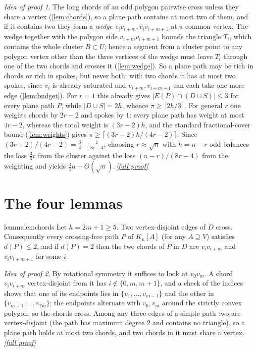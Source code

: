 \documentclass[11pt,a4paper]{article}
\theoremstyle{plain}
\theoremstyle{definition}
\theoremstyle{remark}
\newtheorem*{proofidea}{Idea of proof}
\newcommand{\fullproofref}[1]{\,\hyperref[#1]{\textit{[full proof]}}}
\newcommand{\pipath}{\pi}
\newcommand{\dP}{d}
\begin{document}
\begin{proofidea}
The long chords of an odd polygon pairwise cross unless they share a vertex (\cref{lem:chords}), so a plane path contains at most two of them, and if it contains two they form a \emph{wedge} $v_iv_{i+m},v_iv_{i+m+1}$ at a common vertex. The wedge together with the polygon side $v_{i+m}v_{i+m+1}$ bounds the triangle $T_i$, which contains the whole cluster $B\subset U$; hence a segment from a cluster point to any polygon vertex other than the three vertices of the wedge must leave $T_i$ through one of the two chords and crosses it (\cref{lem:wedge}). So a plane path may be rich in chords or rich in spokes, but never both: with two chords it has at most two spokes, since $v_i$ is already saturated and $v_{i+m},v_{i+m+1}$ can each take one more edge (\cref{lem:budget}). For $r=1$ this already gives $|E(P)\cap(D\cup S)|\le3$ for every plane path $P$, while $|D\cup S|=2h$, whence $\pipath\ge\lceil2h/3\rceil$. For general $r$ one weights chords by $2r-2$ and spokes by $1$: every plane path has weight at most $4r-2$, whereas the total weight is $(3r-2)h$, and the standard fractional-cover bound (\cref{lem:weights}) gives $\pipath\ge\lceil(3r-2)h/(4r-2)\rceil$. Since $(3r-2)/(4r-2)=\tfrac34-\tfrac1{8r-4}$, choosing $r\approx\sqrt n$ with $h=n-r$ odd balances the loss $\tfrac34r$ from the cluster against the loss $(n-r)/(8r-4)$ from the weighting and yields $\tfrac34n-O(\sqrt n)$.\fullproofref{pf:main}
\end{proofidea}

\section{The four lemmas}\label{sec:lemmas}

\begin{restatable}{lemma}{lemchords}\label{lem:chords}
Let $h=2m+1\ge5$. Two vertex-disjoint edges of $D$ cross. Consequently every crossing-free path $P$ of $K_n[A]$ (for any $A\supseteq V$) satisfies $\dP(P)\le2$, and if $\dP(P)=2$ then the two chords of $P$ in $D$ are $v_iv_{i+m}$ and $v_iv_{i+m+1}$ for some $i$.
\end{restatable}
\begin{proofidea}
By rotational symmetry it suffices to look at $v_0v_m$. A chord $v_iv_{i+m}$ vertex-disjoint from it has $i\notin\{0,m,m+1\}$, and a check of the indices shows that one of its endpoints lies in $\{v_1,\dots,v_{m-1}\}$ and the other in $\{v_{m+1},\dots,v_{2m}\}$; the endpoints alternate with $v_0,v_m$ around the strictly convex polygon, so the chords cross. Among any three edges of a simple path two are vertex-disjoint (the path has maximum degree $2$ and contains no triangle), so a plane path holds at most two chords, and two chords in it must share a vertex.\fullproofref{pf:chords}
\end{proofidea}
\end{document}

